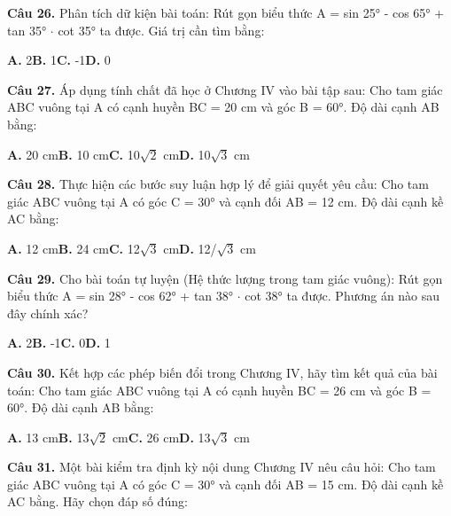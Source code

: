 \documentclass[11pt,a4paper]{article}
\begin{document}
\textbf{\color{primary} Câu 26.} Phân tích dữ kiện bài toán: Rút gọn biểu thức A = sin 25° - cos 65° + tan 35° $\cdot$ cot 35° ta được. Giá trị cần tìm bằng:\par
\hspace*{1.5em}\textbf{A.} 2\quad\quad \textbf{B.} 1\quad\quad \textbf{C.} -1\quad\quad \textbf{D.} 0\par\vspace{2pt}
\textbf{\color{primary} Câu 27.} Áp dụng tính chất đã học ở Chương IV vào bài tập sau: Cho tam giác ABC vuông tại A có cạnh huyền BC = 20 cm và góc B = 60°. Độ dài cạnh AB bằng:\par
\hspace*{1.5em}\textbf{A.} 20 cm\quad\quad \textbf{B.} 10 cm\quad\quad \textbf{C.} 10$\sqrt{2}$ cm\quad\quad \textbf{D.} 10$\sqrt{3}$ cm\par\vspace{2pt}
\textbf{\color{primary} Câu 28.} Thực hiện các bước suy luận hợp lý để giải quyết yêu cầu: Cho tam giác ABC vuông tại A có góc C = 30° và cạnh đối AB = 12 cm. Độ dài cạnh kề AC bằng:\par
\hspace*{1.5em}\textbf{A.} 12 cm\quad\quad \textbf{B.} 24 cm\quad\quad \textbf{C.} 12$\sqrt{3}$ cm\quad\quad \textbf{D.} 12/$\sqrt{3}$ cm\par\vspace{2pt}
\textbf{\color{primary} Câu 29.} Cho bài toán tự luyện (Hệ thức lượng trong tam giác vuông): Rút gọn biểu thức A = sin 28° - cos 62° + tan 38° $\cdot$ cot 38° ta được. Phương án nào sau đây chính xác?\par
\hspace*{1.5em}\textbf{A.} 2\quad\quad \textbf{B.} -1\quad\quad \textbf{C.} 0\quad\quad \textbf{D.} 1\par\vspace{2pt}
\textbf{\color{primary} Câu 30.} Kết hợp các phép biến đổi trong Chương IV, hãy tìm kết quả của bài toán: Cho tam giác ABC vuông tại A có cạnh huyền BC = 26 cm và góc B = 60°. Độ dài cạnh AB bằng:\par
\hspace*{1.5em}\textbf{A.} 13 cm\quad\quad \textbf{B.} 13$\sqrt{2}$ cm\quad\quad \textbf{C.} 26 cm\quad\quad \textbf{D.} 13$\sqrt{3}$ cm\par\vspace{2pt}
\textbf{\color{primary} Câu 31.} Một bài kiểm tra định kỳ nội dung Chương IV nêu câu hỏi: Cho tam giác ABC vuông tại A có góc C = 30° và cạnh đối AB = 15 cm. Độ dài cạnh kề AC bằng. Hãy chọn đáp số đúng:\par
\end{document}
